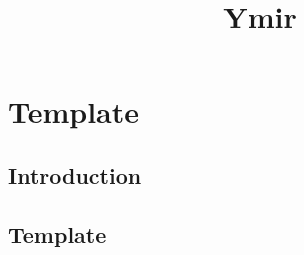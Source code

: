 
\title{Ymir}

\maketitle
\tableofcontents

\chapter*{Template}

\section{Introduction}\label{sec-introduction}

\section{Template}



\cite{stacks-project}

\printbibliography
